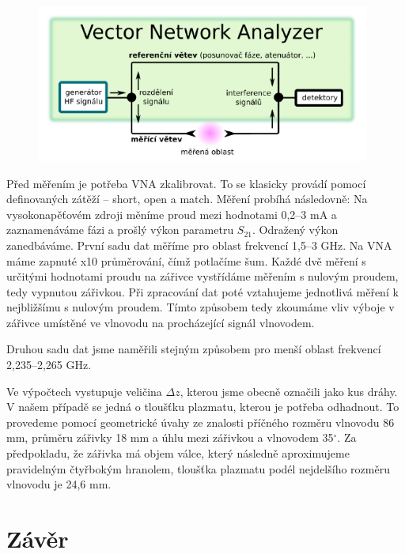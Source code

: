 \documentclass[a4paper,12pt]{article}
\begin{document}
\begin{figure}[h]
	\centering
	\includegraphics[width=110mm]{vna.png}
	\caption{}
	\label{vna}
\end{figure}

Před měřením je potřeba VNA zkalibrovat. To se klasicky provádí pomocí definovaných
zátěží -- short, open a match. Měření probíhá následovně: Na vysokonapěťovém zdroji
měníme proud mezi hodnotami 0,2--3 \si{\milli\ampere} a zaznamenáváme fázi a prošlý
výkon parametru $S_{21}$. Odražený výkon zanedbáváme. První sadu dat měříme pro oblast
frekvencí 1,5--3 \si{\giga\hertz}. Na VNA máme zapnuté x10 průměrování, čímž potlačíme
šum. Každé dvě měření s určitými hodnotami proudu na zářivce vystřídáme měřením s
nulovým proudem, tedy vypnutou zářivkou. Při zpracování dat poté vztahujeme jednotlivá
měření k nejbližšímu s nulovým proudem. Tímto způsobem tedy zkoumáme vliv výboje v zářivce umístěné ve vlnovodu na procházející signál vlnovodem.

Druhou sadu dat jsme naměřili stejným způsobem pro menší oblast frekvencí 2,235--2,265 \si{\giga\hertz}.

Ve výpočtech vystupuje veličina $\Delta z$, kterou jsme obecně označili jako kus dráhy.
V našem případě se jedná o tloušťku plazmatu, kterou je potřeba odhadnout. To provedeme
pomocí geometrické úvahy ze znalosti příčného rozměru vlnovodu 86 \si{\milli\meter},
průměru zářivky 18 \si{\milli\meter} a úhlu mezi zářivkou a vlnovodem 35$^{\circ}$. Za
předpokladu, že zářivka má objem válce, který následně aproximujeme pravidelným
čtyřbokým hranolem, tloušťka plazmatu podél nejdelšího rozměru vlnovodu je 24,6 \si{\milli\meter}.

\section{Závěr}
\end{document}
